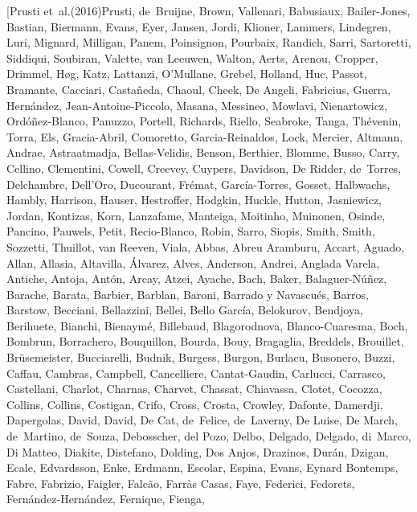 \documentclass[apj, revtex4-1]{emulateapj}
\begin{document}
\begin{thebibliography}{}
\bibitem[{Prusti {et~al.}(2016)Prusti, de~Bruijne, Brown, Vallenari, Babusiaux,
  Bailer-Jones, Bastian, Biermann, Evans, Eyer, Jansen, Jordi, Klioner,
  Lammers, Lindegren, Luri, Mignard, Milligan, Panem, Poinsignon, Pourbaix,
  Randich, Sarri, Sartoretti, Siddiqui, Soubiran, Valette, van Leeuwen, Walton,
  Aerts, Arenou, Cropper, Drimmel, H{\o}g, Katz, Lattanzi, O'Mullane, Grebel,
  Holland, Huc, Passot, Bramante, Cacciari, Casta{\~{n}}eda, Chaoul, Cheek, {De
  Angeli}, Fabricius, Guerra, Hern{\'{a}}ndez, Jean-Antoine-Piccolo, Masana,
  Messineo, Mowlavi, Nienartowicz, Ord{\'{o}}{\~{n}}ez-Blanco, Panuzzo,
  Portell, Richards, Riello, Seabroke, Tanga, Th{\'{e}}venin, Torra, Els,
  Gracia-Abril, Comoretto, Garcia-Reinaldos, Lock, Mercier, Altmann, Andrae,
  Astraatmadja, Bellas-Velidis, Benson, Berthier, Blomme, Busso, Carry,
  Cellino, Clementini, Cowell, Creevey, Cuypers, Davidson, {De Ridder},
  de~Torres, Delchambre, Dell'Oro, Ducourant, Fr{\'{e}}mat,
  Garc{\'{i}}a-Torres, Gosset, Halbwachs, Hambly, Harrison, Hauser, Hestroffer,
  Hodgkin, Huckle, Hutton, Jasniewicz, Jordan, Kontizas, Korn, Lanzafame,
  Manteiga, Moitinho, Muinonen, Osinde, Pancino, Pauwels, Petit, Recio-Blanco,
  Robin, Sarro, Siopis, Smith, Smith, Sozzetti, Thuillot, van Reeven, Viala,
  Abbas, {Abreu Aramburu}, Accart, Aguado, Allan, Allasia, Altavilla,
  {\'{A}}lvarez, Alves, Anderson, Andrei, {Anglada Varela}, Antiche, Antoja,
  Ant{\'{o}}n, Arcay, Atzei, Ayache, Bach, Baker, Balaguer-N{\'{u}}{\~{n}}ez,
  Barache, Barata, Barbier, Barblan, Baroni, {Barrado y Navascu{\'{e}}s},
  Barros, Barstow, Becciani, Bellazzini, Bellei, {Bello Garc{\'{i}}a},
  Belokurov, Bendjoya, Berihuete, Bianchi, Bienaym{\'{e}}, Billebaud,
  Blagorodnova, Blanco-Cuaresma, Boch, Bombrun, Borrachero, Bouquillon, Bourda,
  Bouy, Bragaglia, Breddels, Brouillet, Br{\"{u}}semeister, Bucciarelli,
  Budnik, Burgess, Burgon, Burlacu, Busonero, Buzzi, Caffau, Cambras, Campbell,
  Cancelliere, Cantat-Gaudin, Carlucci, Carrasco, Castellani, Charlot, Charnas,
  Charvet, Chassat, Chiavassa, Clotet, Cocozza, Collins, Collins, Costigan,
  Crifo, Cross, Crosta, Crowley, Dafonte, Damerdji, Dapergolas, David, David,
  {De Cat}, de~Felice, de~Laverny, {De Luise}, {De March}, de~Martino,
  de~Souza, Debosscher, del Pozo, Delbo, Delgado, Delgado, di~Marco, {Di
  Matteo}, Diakite, Distefano, Dolding, {Dos Anjos}, Drazinos, Dur{\'{a}}n,
  Dzigan, Ecale, Edvardsson, Enke, Erdmann, Escolar, Espina, Evans, {Eynard
  Bontemps}, Fabre, Fabrizio, Faigler, Falc{\~{a}}o, {Farr{\`{a}}s Casas},
  Faye, Federici, Fedorets, Fern{\'{a}}ndez-Hern{\'{a}}ndez, Fernique, Fienga,
}
\end{thebibliography}
\end{document}

